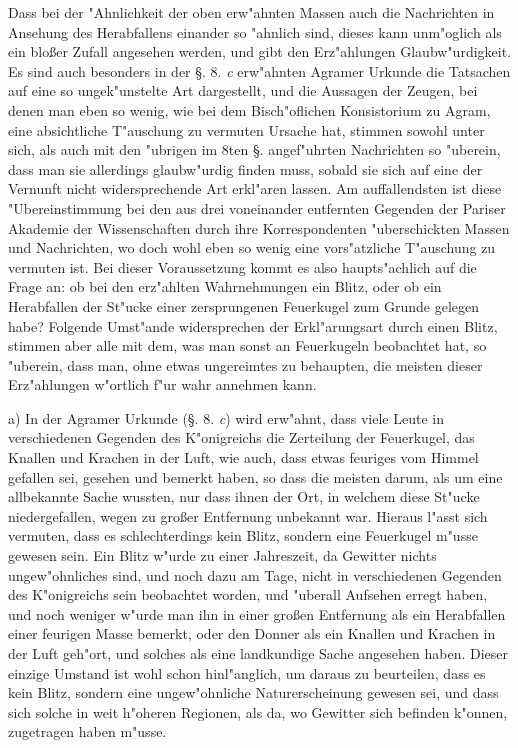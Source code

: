 \documentclass[a4paper, 11pt, oneside, polutonikogreek, german]{article}
\begin{document}
Dass bei der "Ahnlichkeit der oben erw"ahnten Massen auch die Nachrichten in Ansehung des Herabfallens einander so "ahnlich sind, dieses kann unm"oglich als ein bloßer Zufall angesehen werden, und gibt den Erz"ahlungen Glaubw"urdigkeit. Es sind auch besonders in der §. 8. \emph{c} erw"ahnten Agramer Urkunde die Tatsachen auf eine so ungek"unstelte Art dargestellt, und die Aussagen der Zeugen, bei denen man eben so wenig, wie bei dem Bisch"oflichen Konsistorium zu Agram, eine absichtliche T"auschung zu vermuten Ursache hat, stimmen sowohl unter sich, als auch mit den "ubrigen im 8ten §. angef"uhrten Nachrichten so "uberein, dass man sie allerdings glaubw"urdig finden muss, sobald sie sich auf eine der Vernunft nicht widersprechende Art erkl"aren lassen. Am auffallendsten ist diese "Ubereinstimmung bei den aus drei voneinander entfernten Gegenden der Pariser Akademie der Wissenschaften durch ihre Korrespondenten "uberschickten Massen und Nachrichten, wo doch wohl eben so wenig eine vors"atzliche T"auschung zu vermuten ist. Bei dieser Voraussetzung kommt es also haupts"achlich auf die Frage an: ob bei den erz"ahlten Wahrnehmungen ein Blitz, oder ob ein Herabfallen der St"ucke einer zersprungenen Feuerkugel zum Grunde gelegen habe? Folgende Umst"ande widersprechen der Erkl"arungsart durch einen Blitz, stimmen aber alle mit dem, was man sonst an Feuerkugeln beobachtet hat, so "uberein, dass man, ohne etwas ungereimtes zu behaupten, die meisten dieser Erz"ahlungen w"ortlich f"ur wahr annehmen kann.

a) In der Agramer Urkunde (§. 8. \emph{c}) wird erw"ahnt, dass viele Leute in verschiedenen Gegenden des K"onigreichs die Zerteilung der Feuerkugel, das Knallen und Krachen in der Luft, wie auch, dass etwas feuriges vom Himmel gefallen sei, gesehen und bemerkt haben, so dass die meisten darum, als um eine allbekannte Sache wussten, nur dass ihnen der Ort, in welchem diese St"ucke niedergefallen, wegen zu großer Entfernung unbekannt war. Hieraus l"asst sich vermuten, dass es schlechterdings kein Blitz, sondern eine Feuerkugel m"usse gewesen sein. Ein Blitz w"urde zu einer Jahreszeit, da Gewitter nichts ungew"ohnliches sind, und noch dazu am Tage, nicht in verschiedenen Gegenden des K"onigreichs sein beobachtet worden, und "uberall Aufsehen erregt haben, und noch weniger w"urde man ihn in einer großen Entfernung als ein Herabfallen einer feurigen Masse bemerkt, oder den Donner als ein Knallen und Krachen in der Luft geh"ort, und solches als eine landkundige Sache angesehen haben. Dieser einzige Umstand ist wohl schon hinl"anglich, um daraus zu beurteilen, dass es kein Blitz, sondern eine ungew"ohnliche Naturerscheinung gewesen sei, und dass sich solche in weit h"oheren Regionen, als da, wo Gewitter sich befinden k"onnen, zugetragen haben m"usse.
\end{document}

